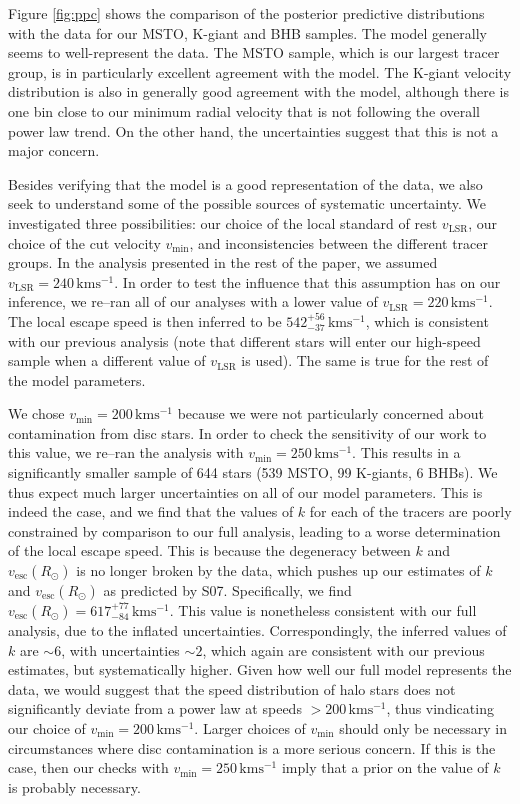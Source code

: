 \documentclass[useAMS,twocolumn,usenatbib]{mn2e}
\def\kms{{\,\mathrm{kms^{-1}}}}
\def\vesc{{v_\mathrm{esc}}}
\def\vmin{{v_\mathrm{min}}}
\begin{document}
Figure \ref{fig:ppc} shows the comparison of the posterior predictive distributions with the data 
for our MSTO, K-giant and BHB samples. The model generally seems to well-represent the data. The MSTO sample, which is our 
largest tracer group, is in particularly excellent agreement with the model. The K-giant velocity 
distribution is also in generally good agreement with the model, although there is one bin close to 
our minimum radial velocity that is not following the overall power law trend. On the other hand, the 
uncertainties suggest that this is not a major concern. 

Besides verifying that the model is a good representation of the data, we also seek to understand some of the 
possible sources of systematic uncertainty. We investigated three possibilities: our choice of the 
local standard of rest $v_\mathrm{LSR}$, our choice of the cut velocity $\vmin$, and inconsistencies between the different 
tracer groups. In the analysis presented in the rest of the paper, we assumed $v_\mathrm{LSR} = 240\kms$. In order 
to test the influence that this assumption has on our inference, we re--ran all of our analyses with 
a lower value of $v_\mathrm{LSR} = 220\kms$. The local escape speed is then inferred to be $542^{+56}_{-37}\kms$, 
which is consistent with our previous analysis (note that different stars will enter our high-speed sample 
when a different value of $v_\mathrm{LSR}$ is used). The same is true for the rest of the model parameters. 

We chose $\vmin=200\kms$ because we were not particularly concerned about contamination from disc stars. In order to 
check the sensitivity of our work to this value, we re--ran the analysis with $\vmin = 250\kms$. This results in a 
significantly smaller sample of 644 stars (539 MSTO, 99 K-giants, 6 BHBs). We thus expect much larger uncertainties 
on all of our model parameters. This is indeed the case, and we find that the values of $k$ for each of the tracers 
are poorly constrained by comparison to our full analysis, leading to a worse determination of the local escape 
speed. This is because the degeneracy between $k$ and $\vesc(R_\odot)$ is no longer broken by the data, which pushes 
up our estimates of $k$ and $\vesc(R_\odot)$ as predicted by S07. Specifically, we find $\vesc(R_\odot) = 617^{+77}_{-84}\kms$. 
This value is nonetheless consistent with our full analysis, due to the inflated uncertainties. Correspondingly, the 
inferred values of $k$ are $\sim 6$, with uncertainties $\sim 2$, which again are consistent with our previous estimates, 
but systematically higher. Given how well our full model represents the data, we would suggest that the speed distribution 
of halo stars does not significantly deviate from a power law at speeds $>200\kms$, thus vindicating our choice of 
$\vmin = 200\kms$. Larger choices of $\vmin$ should only be necessary in circumstances where disc contamination is a 
more serious concern. If this is the case, then our checks with $\vmin = 250\kms$ imply that a prior on the value 
of $k$ is probably necessary.
\end{document}
